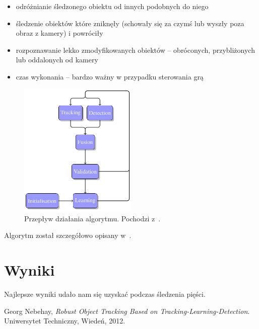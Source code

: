 \documentclass{article}
\newenvironment{tightlist}{
\begin{itemize}
  \setlength{\itemsep}{1pt}
  \setlength{\parskip}{0pt}
  \setlength{\parsep}{0pt}}
{\end{itemize}}
\begin{document}
\begin{tightlist}
\item odróżnianie śledzonego obiektu od innych podobnych do niego
\item śledzenie obiektów które zniknęły (schowały się za czymś lub wyszły poza obraz z kamery) i powróciły
\item rozpoznawanie lekko zmodyfikowanych obiektów -- obróconych, przybliżonych lub oddalonych od kamery
\item czas wykonania -- bardzo ważny w przypadku sterowania grą
\end{tightlist}

\begin{figure}[!ht]
\centering
\includegraphics[width=0.5\textwidth]{alg_flow.png}
\caption{Przepływ działania algorytmu. Pochodzi z~\cite{TDL-thesis}.}
\label{fig:flow}
\end{figure}

Algorytm został szczegółowo opisany w~\cite{TDL-thesis}.

\section{Wyniki} \label{results}

Najlepsze wyniki udało nam się uzyskać podczas śledzenia pięści. 

\begin{thebibliography}{9}

  Georg Nebehay,
  \emph{Robust Object Tracking Based on Tracking-Learning-Detection}.
  Uniwersytet Techniczny, Wiedeń,
  2012.

\end{thebibliography}
\end{document}
